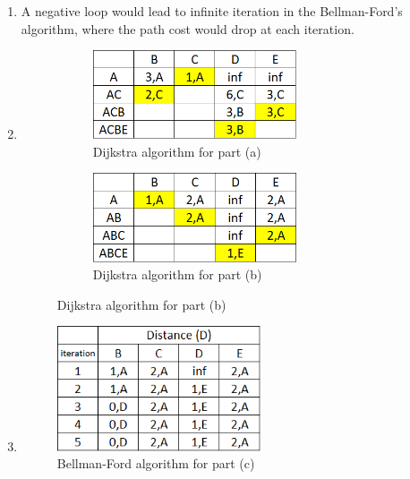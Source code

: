 \documentclass[10pt,letterpaper]{article}
\begin{document}
\begin{enumerate}[label=\alph*-]
\item
A negative loop would lead to infinite iteration in the Bellman-Ford's algorithm, where the path cost would drop at each iteration.

\item
{\color{white}{invisible}}
\begin{figure}[h]
\centering
\begin{subfigure}{0.48\textwidth}
\centering
\includegraphics[width=60mm]{dij1.png}
\caption{Dijkstra algorithm for part (a)}
\end{subfigure}
\begin{subfigure}{0.48\textwidth}
\centering
\includegraphics[width=60mm]{dij2.png}
\caption{Dijkstra algorithm for part (b)}
\label{bf}
\end{subfigure}
\end{figure}
\item
{\color{white}{invisible}}
\begin{figure}[h]
\centering
\includegraphics[width=60mm]{bellford.png}
\caption{Bellman-Ford algorithm for part (c)}
\end{figure}
\end{enumerate}
\end{document}
